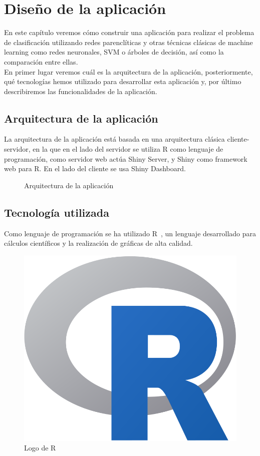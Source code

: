 \chapter{Diseño de la aplicación}\label{cap:diseño}

En este capítulo veremos cómo construir una aplicación para realizar el problema de clasificación utilizando redes parenclíticas y otras técnicas clásicas de machine learning como redes neuronales, SVM o árboles de decisión, así como la comparación entre ellas.\\

En primer lugar veremos cuál es la arquitectura de la aplicación, posteriormente, qué tecnologías hemos utilizado para desarrollar esta aplicación y, por último describiremos las funcionalidades de la aplicación.

\section{Arquitectura de la aplicación}

La arquitectura de la aplicación está basada en una arquitectura clásica cliente-servidor, en la que en el lado del servidor se utiliza R como lenguaje de programación, como servidor web actúa Shiny Server, y Shiny como framework web para R. En el lado del cliente se usa Shiny Dashboard.

\begin{figure}[htbp!]
	\centering
	\arquitectura
	\caption{Arquitectura de la aplicación}
	\label{fig:arquitectura}
\end{figure}

\section{Tecnología utilizada}

Como lenguaje de programación se ha utilizado R~\cite{R}, un lenguaje desarrollado para cálculos científicos y la realización de gráficas de alta calidad.

\begin{figure}[htbp!]
\centering
\includegraphics[width=0.3\linewidth]{imagenes/R}
\caption{Logo de R}
\label{fig:R}
\end{figure}

